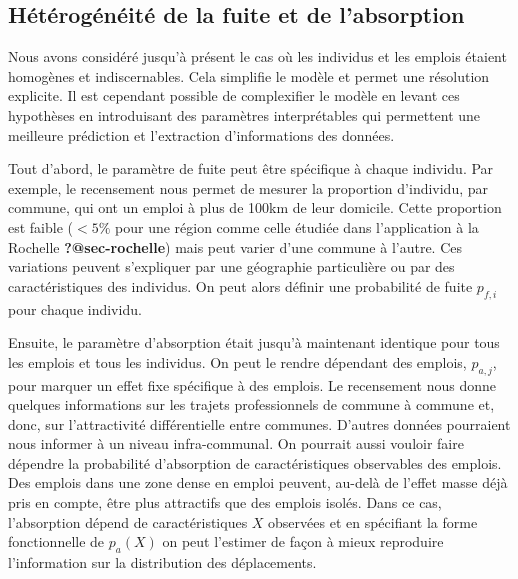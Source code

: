 \documentclass[
  10pt,
  a4paper,
  numbers=noendperiod,
  DIV=9]{scrreprt}
\begin{document}
\hypertarget{sec-hetero}{%
\subsection{Hétérogénéité de la fuite et de
l'absorption}\label{sec-hetero}}

Nous avons considéré jusqu'à présent le cas où les individus et les
emplois étaient homogènes et indiscernables. Cela simplifie le modèle et
permet une résolution explicite. Il est cependant possible de
complexifier le modèle en levant ces hypothèses en introduisant des
paramètres interprétables qui permettent une meilleure prédiction et
l'extraction d'informations des données.

Tout d'abord, le paramètre de fuite peut être spécifique à chaque
individu. Par exemple, le recensement nous permet de mesurer la
proportion d'individu, par commune, qui ont un emploi à plus de 100km de
leur domicile. Cette proportion est faible (\(<5\%\) pour une région
comme celle étudiée dans l'application à la Rochelle
\textbf{?@sec-rochelle}) mais peut varier d'une commune à l'autre. Ces
variations peuvent s'expliquer par une géographie particulière ou par
des caractéristiques des individus. On peut alors définir une
probabilité de fuite \(p_{f,i}\) pour chaque individu.

Ensuite, le paramètre d'absorption était jusqu'à maintenant identique
pour tous les emplois et tous les individus. On peut le rendre dépendant
des emplois, \(p_{a,j}\), pour marquer un effet fixe spécifique à des
emplois. Le recensement nous donne quelques informations sur les trajets
professionnels de commune à commune et, donc, sur l'attractivité
différentielle entre communes. D'autres données pourraient nous informer
à un niveau infra-communal. On pourrait aussi vouloir faire dépendre la
probabilité d'absorption de caractéristiques observables des emplois.
Des emplois dans une zone dense en emploi peuvent, au-delà de l'effet
masse déjà pris en compte, être plus attractifs que des emplois isolés.
Dans ce cas, l'absorption dépend de caractéristiques \(X\) observées et
en spécifiant la forme fonctionnelle de \(p_a(X)\) on peut l'estimer de
façon à mieux reproduire l'information sur la distribution des
déplacements.
\end{document}
